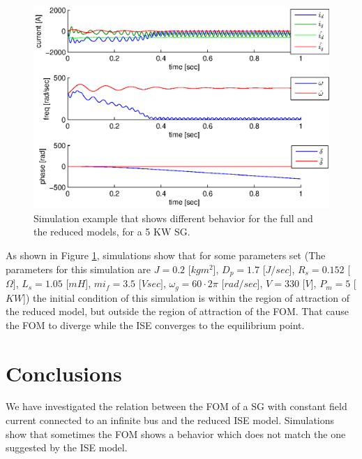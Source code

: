 \documentclass[conference]{IEEEtran}
\begin{document}
\begin{figure}[ht]
\includegraphics[scale=0.6]{simDiffRegionOFAttraction}
\caption{Simulation example that shows different behavior for the 
full and the reduced models, for a 5 KW SG.}
\label{fig:InfBusOne1DiffRegionOfAttraction}
\end{figure}

As shown in Figure \ref{fig:InfBusOne1DiffRegionOfAttraction},
simulations show that for some parameters set (The parameters for this
simulation are $J=0.2$ {[}$kgm^{2}${]}, $D_{p}=1.7$ {[}$J/sec${]},
$R_{s}=0.152$ {[}$\Omega]$, $L_{s}=1.05$ {[}$mH${]}, $mi_{f}=3.5$
{[}$Vsec]$, $\omega_{g}=60\cdotp2\pi$ {[}$rad/sec${]}, $V=330$
{[}$V]$, $P_m=5$ {[}$KW${]}) the initial condition of this simulation
is within the region of attraction of the reduced model, but outside
the region of attraction of the FOM. That cause the FOM to diverge while the ISE converges to the
equilibrium point.

\section{Conclusions}

We have investigated the relation between the FOM of a SG with constant
field current connected to an infinite bus and the reduced ISE model. 
Simulations show that sometimes the FOM shows a behavior which does
not match the one suggested by the ISE model. 
\end{document}
